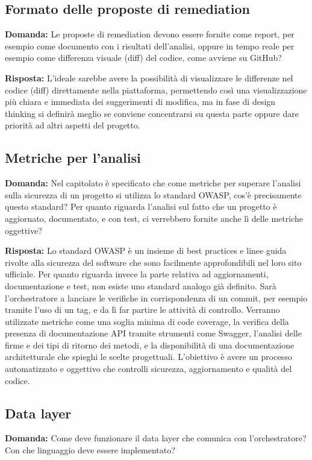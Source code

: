 \documentclass[a4paper,12pt]{article}
\begin{document}
{    \subsection{Formato delle proposte di remediation}
    \textbf{Domanda:} Le proposte di remediation devono essere fornite come report, per esempio come documento con i risultati dell'analisi, oppure in tempo reale per esempio come differenza visuale (diff) del codice, come avviene su GitHub?

    \textbf{Risposta:} L'ideale sarebbe avere la possibilità di visualizzare le differenze nel codice (diff) direttamente nella piattaforma, permettendo così una visualizzazione più chiara e immediata dei suggerimenti di modifica, ma in fase di design thinking si definirà meglio se conviene concentrarsi su questa parte oppure dare priorità ad altri aspetti del progetto.

    \subsection{Metriche per l'analisi}
    \textbf{Domanda:} Nel capitolato è specificato che come metriche per superare l'analisi sulla sicurezza di un progetto si utilizza lo standard OWASP, cos'è precisamente questo standard? Per quanto riguarda l'analisi sul fatto che un progetto è aggiornato, documentato, e con test, ci verrebbero fornite anche lì delle metriche oggettive?

    \textbf{Risposta:} Lo standard OWASP è un insieme di best practices e linee guida rivolte alla sicurezza del software che sono facilmente approfondibili nel loro sito ufficiale. Per quanto riguarda invece la parte relativa ad aggiornamenti, documentazione e test, non esiste uno standard analogo già definito. Sarà l'orchestratore a lanciare le verifiche in corrispondenza di un commit, per esempio tramite l'uso di un tag, e da lì far partire le attività di controllo. Verranno utilizzate metriche come una soglia minima di code coverage, la verifica della presenza di documentazione API tramite strumenti come Swagger, l'analisi delle firme e dei tipi di ritorno dei metodi, e la disponibilità di una documentazione architetturale che spieghi le scelte progettuali. L'obiettivo è avere un processo automatizzato e oggettivo che controlli sicurezza, aggiornamento e qualità del codice.

    \subsection{Data layer}
    \textbf{Domanda:} Come deve funzionare il data layer che comunica con l'orchestratore? Con che linguaggio deve essere implementato?

}
\end{document}
